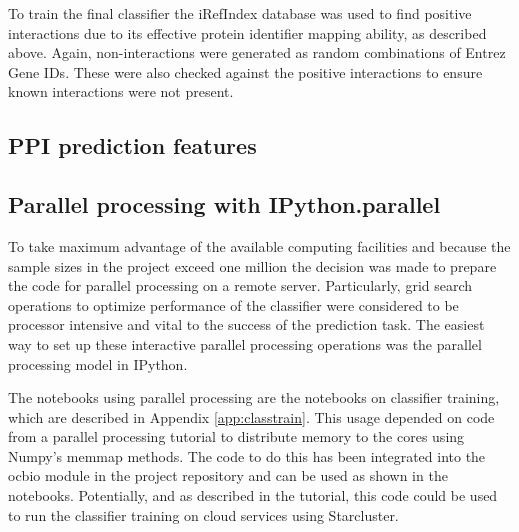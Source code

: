 To train the final classifier the iRefIndex\autocite{razick_irefindex:_2008} database was used to find positive interactions due to its effective protein identifier mapping ability, as described above.
Again, non-interactions were generated as random combinations of Entrez Gene IDs.
These were also checked against the positive interactions to ensure known interactions were not present.

\subsection{PPI prediction features}







\subsection{Parallel processing with IPython.parallel}

To take maximum advantage of the available computing facilities and because the sample sizes in the project exceed one million the decision was made to prepare the code for parallel processing on a remote server.
Particularly, grid search operations to optimize performance of the classifier were considered to be processor intensive and vital to the success of the prediction task.
The easiest way to set up these interactive parallel processing operations was the parallel processing model in IPython\autocite{parallel_python_webpage}.

The notebooks using parallel processing are the notebooks on classifier training, which are described in Appendix \ref{app:classtrain}.
This usage depended on code from a parallel processing tutorial\autocite{ogrisel_parallel} to distribute memory to the cores using Numpy's memmap methods.
The code to do this has been integrated into the ocbio module in the project repository and can be used as shown in the notebooks.
Potentially, and as described in the tutorial, this code could be used to run the classifier training on cloud services using Starcluster.


